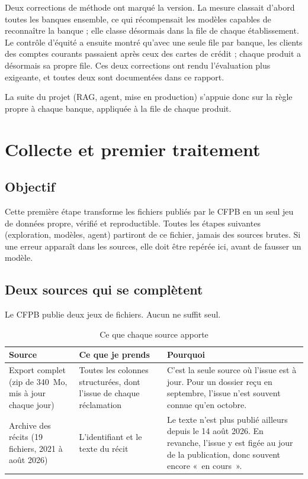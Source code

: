 \documentclass[11pt,a4paper]{article}
\begin{document}
Deux corrections de méthode ont marqué la version. La mesure classait d'abord toutes les banques ensemble, ce qui récompensait les modèles capables de reconnaître la banque ; elle classe désormais dans la file de chaque établissement. Le contrôle d'équité a ensuite montré qu'avec une seule file par banque, les clients des comptes courants passaient après ceux des cartes de crédit ; chaque produit a désormais sa propre file. Ces deux corrections ont rendu l'évaluation plus exigeante, et toutes deux sont documentées dans ce rapport.

La suite du projet (RAG, agent, mise en production) s'appuie donc sur la règle propre à chaque banque, appliquée à la file de chaque produit.

\setcounter{tocdepth}{1}
\tableofcontents
\newpage

\section{Collecte et premier traitement}

\subsection{Objectif}

Cette première étape transforme les fichiers publiés par le CFPB en un seul jeu de données propre, vérifié et reproductible. Toutes les étapes suivantes (exploration, modèles, agent) partiront de ce fichier, jamais des sources brutes. Si une erreur apparaît dans les sources, elle doit être repérée ici, avant de fausser un modèle.

\subsection{Deux sources qui se complètent}

Le CFPB publie deux jeux de fichiers. Aucun ne suffit seul.

\begin{table}[H]
\centering\small
\begin{tabularx}{\linewidth}{@{}Y Y Y@{}}
\toprule
Source & Ce que je prends & Pourquoi \\
\midrule
Export complet (zip de 340~Mo, mis à jour chaque jour) & Toutes les colonnes structurées, dont l'issue de chaque réclamation & C'est la seule source où l'issue est à jour. Pour un dossier reçu en septembre, l'issue n'est souvent connue qu'en octobre. \\
Archive des récits (19 fichiers, 2021 à août 2026) & L'identifiant et le texte du récit & Le texte n'est plus publié ailleurs depuis le 14 août 2026. En revanche, l'issue y est figée au jour de la publication, donc souvent encore «~en cours~». \\
\bottomrule
\end{tabularx}
\caption{Ce que chaque source apporte}
\end{table}
\end{document}
